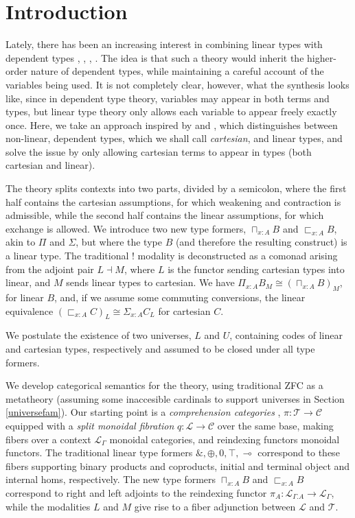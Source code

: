 \section{Introduction}
Lately, there has been an increasing interest in combining linear types with dependent types  \cite{schreiber2014quantization}, \cite{krishnaswami}, \cite{vakar14}, \cite{nothing}. The idea is that such a theory would inherit the higher-order nature of dependent types, while maintaining a careful account of the variables being used. It is not completely clear, however, what the synthesis looks like, since in dependent type theory, variables may appear in both terms and types, but linear type theory only allows each variable to appear freely exactly once. Here, we take an approach inspired by \cite{krishnaswami} and \cite{vakar14}, which distinguishes between non-linear, dependent types, which we shall call \textit{cartesian}, and linear types, and solve the issue by only allowing cartesian terms to appear in types (both cartesian and linear).

The theory splits contexts into two parts, divided by a semicolon, where the first half contains the cartesian assumptions, for which weakening and contraction is admissible, while the second half contains the linear assumptions, for which exchange is allowed. We introduce two new type formers, $\sqcap_{x : A}B$ and $\sqsubset_{x : A}B$, akin to $\Pi$ and $\Sigma$, but where the type $B$ (and therefore the resulting construct) is a linear type. The traditional $!$ modality is deconstructed as a comonad arising from the adjoint pair $L \dashv M$, where $L$ is the functor sending cartesian types into linear, and $M$ sends linear types to cartesian. We have $\Pi_{x : A}B_M \cong (\sqcap_{x :A}B)_M$, for linear $B$, and, if we assume some commuting conversions, the linear equivalence $(\sqsubset_{x :A}C)_L \cong \Sigma_{x :A}C_L$ for cartesian $C$.

We postulate the existence of two universes, $L$ and $U$, containing codes of linear and cartesian types, respectively and assumed to be closed under all type formers.

We develop categorical semantics for the theory, using traditional ZFC as a metatheory (assuming some inaccesible cardinals to support universes in Section \ref{universefam}). Our starting point is a \textit{comprehension categories} \cite{jacobs}, $\pi : \mathcal{T} \to \mathcal{C}$ equipped with a \textit{split monoidal fibration} $q : \mathcal{L} \to \mathcal{C}$ over the same base, making fibers over a context $\mathcal{L}_\Gamma$ monoidal categories, and reindexing functors monoidal functors. The traditional linear type formers $\&, \oplus, 0, \top, \multimap$ correspond to these fibers supporting binary products and coproducts, initial and terminal object and internal homs, respectively. The new type formers $\sqcap_{x : A}B$ and $\sqsubset_{x :A}B$ correspond to right and left adjoints to the reindexing functor $\pi_A : \mathcal{L}_{\Gamma.A} \to \mathcal{L}_\Gamma$, while the modalities $L$ and $M$ give rise to a fiber adjunction between $\mathcal{L}$ and $\mathcal{T}$.

